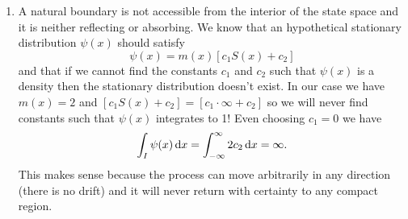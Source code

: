 \documentclass[12pt]{article}
\begin{document}
\begin{enumerate}
		\begin{equation*}
			\Sigma(l)=\int_{l}^{x}M[\eta,x]\dif S(\eta)\quad\mathrm{and}\quad N(l)=\int_{l}^{x}M(l,\xi]\dif S(\xi)
		\end{equation*}
		then we will have also that $\Sigma(-\infty)=\Sigma(\infty)=\infty$ and $N(-\infty)=N(\infty)=\infty$. According to our table, this means that both boundaries will be 
		\begin{itemize}
			\item natural;
			\item non-attracting;
			\item unattainable.
		\end{itemize}
		\item A natural boundary is not accessible from the interior of the state space and it is neither reflecting or absorbing. We know that an hypothetical stationary distribution $\psi(x)$ should satisfy
		\begin{equation*}
			\psi(x)=m(x)\left[c_{1}S(x)+c_{2}\right]
		\end{equation*}
		and that if we cannot find the constants $c_{1}$ and $c_{2}$ such that $\psi(x)$ is a density then the stationary distribution doesn't exist. In our case we have $m(x)=2$ and $\left[c_{1}S(x)+c_{2}\right]=\left[c_{1}\cdot\infty+c_{2}\right]$ so we will never find constants such that $\psi(x)$ integrates to 1! Even choosing $c_{1}=0$ we have
		\begin{equation*}
			\int_{I}\psi(x)\mathop{}\!\mathrm{d} x=\int_{-\infty}^{\infty}2c_{2}\mathop{}\!\mathrm{d} x=\infty.
		\end{equation*}
		This makes sense because the process can move arbitrarily in any direction (there is no drift) and it will never return with certainty to any compact region.
	\end{enumerate}
	\printbibliography
\end{document}
